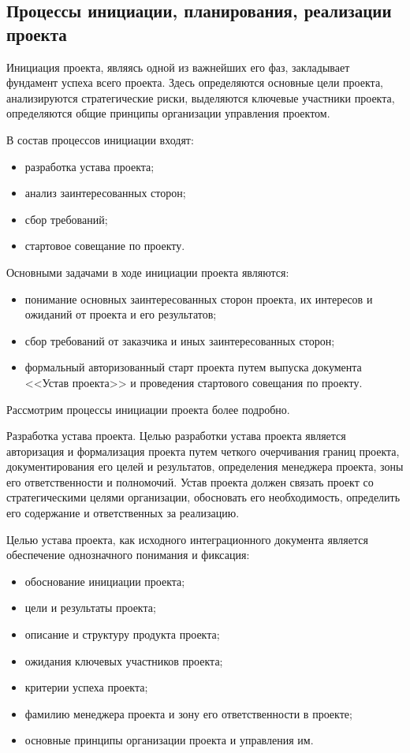 \subsection{Процессы инициации, планирования, реализации проекта}

Инициация проекта, являясь одной из важнейших его фаз, закладывает фундамент успеха всего проекта.
Здесь определяются основные цели проекта, анализируются стратегические риски, выделяются ключевые участники проекта, определяются общие принципы организации управления проектом.

В состав процессов инициации входят:
\begin{itemize}
	\item  разработка устава проекта;
	\item  анализ заинтересованных сторон;
	\item  сбор требований;
	\item  стартовое совещание по проекту.
\end{itemize}

Основными задачами в ходе инициации проекта являются:
\begin{itemize}
	\item понимание основных заинтересованных сторон проекта, их интере­сов и ожиданий от проекта и его результатов;
	\item сбор требований от заказчика и иных заинтересованных сторон;
	\item формальный авторизованный старт проекта путем выпуска до­кумента <<Устав проекта>> и проведения стартового совещания по
	проекту.
\end{itemize}

Рассмотрим процессы инициации проекта более подробно.

Разработка устава проекта.
Целью разработки устава проекта является авторизация и формализа­ция проекта путем четкого очерчивания границ проекта, документиро­вания его целей и результатов, определения менеджера проекта, зоны его ответственности и полномочий.
Устав проекта должен связать проект со стратегическими целями организации, обосновать его необходимость, определить его содержа­ние и ответственных за реализацию.

Целью устава проекта, как исходного интеграционного документа является обеспечение однозначного понимания и фиксация:
\begin{itemize}
	\item  обоснование инициации проекта;
	\item  цели и результаты проекта;
	\item  описание и структуру продукта проекта;
	\item ожидания ключевых участников проекта;
	\item критерии успеха проекта;
	\item фамилию менеджера проекта и зону его ответственности в проекте;
	\item основные принципы организации проекта и управления им.
\end{itemize}

